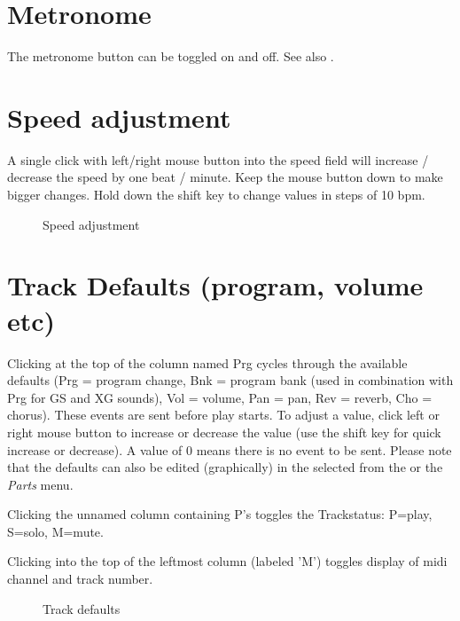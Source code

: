 \documentclass[letterpaper]{report}
\begin{document}
\section{Metronome}\label{metro}

The metronome button can be toggled on and off.
See also .

\section{Speed adjustment}\label{speed}

A single click with left/right mouse button into the speed field will
increase / decrease the speed by one beat / minute. Keep the mouse button
down to make bigger changes. Hold down the shift key to change
values in steps of 10 bpm.

\begin{figure}%
%
%
\caption{Speed adjustment}%
\end{figure}


\section{Track Defaults (program, volume etc)}\label{trackdefs}

Clicking at the top of the column named Prg cycles through the available
defaults (Prg = program change, Bnk = program bank (used in combination
with Prg for GS and XG sounds), Vol = volume, Pan = pan, Rev = reverb,
Cho = chorus). These events are sent before play starts. To adjust a
value, click left or right mouse button to increase or decrease the
value (use the shift key for quick increase or decrease). A value of 0
means there is no event to be sent. Please note that the defaults can also be
edited (graphically) in the  selected from the
 or the {\em Parts} menu.

Clicking the unnamed column containing P's toggles the Trackstatus:
P=play, S=solo, M=mute.

Clicking into the top of the leftmost column (labeled 'M') toggles
display of midi channel and track number.

\begin{figure}%
%
%
\caption{Track defaults}%
\end{figure}
\end{document}
